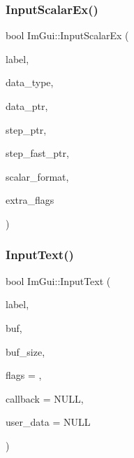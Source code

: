 \subsubsection{\texorpdfstring{Input\+Scalar\+Ex()}{InputScalarEx()}}
{\footnotesize\ttfamily bool Im\+Gui\+::\+Input\+Scalar\+Ex (\begin{DoxyParamCaption}\item[{const char $\ast$}]{label,  }\item[{Im\+Gui\+Data\+Type}]{data\+\_\+type,  }\item[{void $\ast$}]{data\+\_\+ptr,  }\item[{void $\ast$}]{step\+\_\+ptr,  }\item[{void $\ast$}]{step\+\_\+fast\+\_\+ptr,  }\item[{const char $\ast$}]{scalar\+\_\+format,  }\item[{Im\+Gui\+Input\+Text\+Flags}]{extra\+\_\+flags }\end{DoxyParamCaption})}

\hypertarget{namespace_im_gui_af2faa757ec3f5e6379f15b0acfac48f7}{}\label{namespace_im_gui_af2faa757ec3f5e6379f15b0acfac48f7} 
\subsubsection{\texorpdfstring{Input\+Text()}{InputText()}}
{\footnotesize\ttfamily bool Im\+Gui\+::\+Input\+Text (\begin{DoxyParamCaption}\item[{const char $\ast$}]{label,  }\item[{char $\ast$}]{buf,  }\item[{size\+\_\+t}]{buf\+\_\+size,  }\item[{Im\+Gui\+Input\+Text\+Flags}]{flags = {},  }\item[{Im\+Gui\+Text\+Edit\+Callback}]{callback = {\ttfamily NULL},  }\item[{void $\ast$}]{user\+\_\+data = {\ttfamily NULL} }\end{DoxyParamCaption})}

\hypertarget{namespace_im_gui_a4a62260abe773d4e193db94cdfdc41bf}{}\label{namespace_im_gui_a4a62260abe773d4e193db94cdfdc41bf} 
